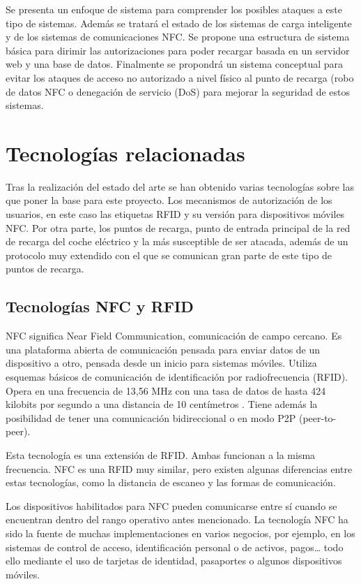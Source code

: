 \documentclass[12pt,a4paper,onecolumn,oneside]{report}
\begin{document}
Se presenta un enfoque de sistema para comprender los posibles ataques a este tipo de sistemas. Además se tratará el estado de los sistemas de carga inteligente y de los sistemas de comunicaciones NFC. Se propone una estructura de sistema básica para dirimir las autorizaciones para poder recargar basada en un servidor web y una base de datos. Finalmente se propondrá un sistema conceptual para evitar los ataques de acceso no autorizado a nivel físico al punto de recarga (robo de datos NFC o denegación de servicio (DoS) para mejorar la seguridad de estos sistemas.




\section{Tecnologías relacionadas}

Tras la realización del estado del arte se han obtenido varias tecnologías sobre las que poner la base para este proyecto. Los mecanismos de autorización de los usuarios, en este caso las etiquetas RFID y su versión para dispositivos móviles NFC. Por otra parte, los puntos de recarga, punto de entrada principal de la red de recarga del coche eléctrico y la más susceptible de ser atacada, además de un protocolo muy extendido con el que se comunican gran parte de este tipo de puntos de recarga.

\subsection{Tecnologías NFC y RFID}
\label{Tecnologías NFC y RFID}

NFC significa Near Field Communication, comunicación de campo cercano. Es una plataforma abierta de comunicación pensada para enviar datos de un dispositivo a otro, pensada desde un inicio para sistemas móviles. Utiliza esquemas básicos de comunicación de identificación por radiofrecuencia (RFID). Opera en una frecuencia de 13,56 MHz con una tasa de datos de hasta 424 kilobits por segundo a una distancia de 10 centímetros \cite{uno}. Tiene además la posibilidad de tener una comunicación bidireccional o en modo P2P (peer-to-peer).

Esta tecnología es una extensión de RFID. Ambas funcionan a la misma frecuencia. NFC es una RFID muy similar, pero existen algunas diferencias entre estas tecnologías, como la distancia de escaneo y las formas de comunicación. 

Los dispositivos habilitados para NFC pueden comunicarse entre sí cuando se encuentran dentro del rango operativo antes mencionado. La tecnología NFC ha sido la fuente de muchas implementaciones en varios negocios, por ejemplo, en los sistemas de control de acceso, identificación personal o de activos, pagos… todo ello mediante el uso de tarjetas de identidad, pasaportes o algunos dispositivos móviles.
\end{document}
